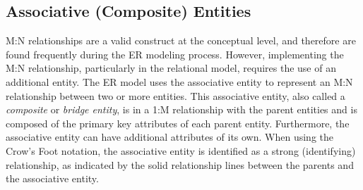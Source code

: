 \documentclass[a4paper, 12pt, titlepage]{report}
\begin{document}
{\subsection{Associative (Composite) Entities}
M:N relationships are a valid construct at the conceptual level, and therefore are found frequently during the ER modeling process. However, implementing the M:N
relationship, particularly in the relational model, requires the use of an additional entity. The ER model uses the associative entity to represent an M:N relationship between two or more entities. This associative entity, also called a \emph{composite} or \emph{bridge entity}, is in a 1:M relationship with the parent entities and is composed of
the primary key attributes of each parent entity. Furthermore, the associative entity can have additional attributes of its own. When using the Crow’s Foot notation, the associative entity is identified as a strong (identifying) relationship, as indicated by the solid relationship lines between the parents and the associative entity.
\pagebreak
}
\end{document}
